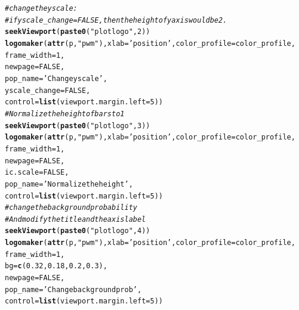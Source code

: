 \documentclass[12pt]{article}\usepackage[]{graphicx}\usepackage[usenames,dvipsnames]{color}
\makeatletter
\newcommand{\hlnum}[1]{\textcolor[rgb]{0.686,0.059,0.569}{#1}}%
\newcommand{\hlstr}[1]{\textcolor[rgb]{0.192,0.494,0.8}{#1}}%
\newcommand{\hlcom}[1]{\textcolor[rgb]{0.678,0.584,0.686}{\textit{#1}}}%
\newcommand{\hlstd}[1]{\textcolor[rgb]{0.345,0.345,0.345}{#1}}%
\newcommand{\hlkwc}[1]{\textcolor[rgb]{0.333,0.667,0.333}{#1}}%
\newcommand{\hlkwd}[1]{\textcolor[rgb]{0.737,0.353,0.396}{\textbf{#1}}}%
\newenvironment{kframe}{%
 \def\at@end@of@kframe{}%
 \ifinner\ifhmode%
  \def\at@end@of@kframe{\end{minipage}}%
  \begin{minipage}{\columnwidth}%
 \fi\fi%
 \def\FrameCommand##1{\hskip\@totalleftmargin \hskip-\fboxsep
 \colorbox{shadecolor}{##1}\hskip-\fboxsep
     \hskip-\linewidth \hskip-\@totalleftmargin \hskip\columnwidth}%
 \MakeFramed {\advance\hsize-\width
   \@totalleftmargin\z@ \linewidth\hsize
   \@setminipage}}%
 {\par\unskip\endMakeFramed%
 \at@end@of@kframe}
\newenvironment{knitrout}{}{} %
\makeatother
\begin{document}
\begin{knitrout}
\begin{kframe}
\begin{alltt}
\hlcom{#change the y scale:}
\hlcom{#if yscale_change = FALSE, then the height of y axis would be 2.}
\hlkwd{seekViewport}\hlstd{(}\hlkwd{paste0}\hlstd{(}\hlstr{"plotlogo"}\hlstd{,} \hlnum{2}\hlstd{))}
\hlkwd{logomaker}\hlstd{(}\hlkwd{attr}\hlstd{(p,} \hlstr{"pwm"}\hlstd{),}\hlkwc{xlab} \hlstd{=} \hlstr{'position'}\hlstd{,}\hlkwc{color_profile} \hlstd{= color_profile,}
          \hlkwc{frame_width} \hlstd{=} \hlnum{1}\hlstd{,}
          \hlkwc{newpage} \hlstd{=} \hlnum{FALSE}\hlstd{,}
          \hlkwc{pop_name} \hlstd{=} \hlstr{'Change y scale'}\hlstd{,}
          \hlkwc{yscale_change} \hlstd{=} \hlnum{FALSE}\hlstd{,}
          \hlkwc{control} \hlstd{=} \hlkwd{list}\hlstd{(}\hlkwc{viewport.margin.left} \hlstd{=} \hlnum{5}\hlstd{))}
\hlcom{#Normalize the height of bars to 1}
\hlkwd{seekViewport}\hlstd{(}\hlkwd{paste0}\hlstd{(}\hlstr{"plotlogo"}\hlstd{,} \hlnum{3}\hlstd{))}
\hlkwd{logomaker}\hlstd{(}\hlkwd{attr}\hlstd{(p,} \hlstr{"pwm"}\hlstd{),}\hlkwc{xlab} \hlstd{=} \hlstr{'position'}\hlstd{,}\hlkwc{color_profile} \hlstd{= color_profile,}
          \hlkwc{frame_width} \hlstd{=} \hlnum{1}\hlstd{,}
          \hlkwc{newpage} \hlstd{=} \hlnum{FALSE}\hlstd{,}
          \hlkwc{ic.scale} \hlstd{=} \hlnum{FALSE}\hlstd{,}
          \hlkwc{pop_name} \hlstd{=} \hlstr{'Normalize the height'}\hlstd{,}
          \hlkwc{control} \hlstd{=} \hlkwd{list}\hlstd{(}\hlkwc{viewport.margin.left} \hlstd{=} \hlnum{5}\hlstd{))}
\hlcom{#change the background probability}
\hlcom{#And modify the title and the axis label}
\hlkwd{seekViewport}\hlstd{(}\hlkwd{paste0}\hlstd{(}\hlstr{"plotlogo"}\hlstd{,} \hlnum{4}\hlstd{))}
\hlkwd{logomaker}\hlstd{(}\hlkwd{attr}\hlstd{(p,} \hlstr{"pwm"}\hlstd{),}\hlkwc{xlab} \hlstd{=} \hlstr{'position'}\hlstd{,}\hlkwc{color_profile} \hlstd{= color_profile,}
          \hlkwc{frame_width} \hlstd{=} \hlnum{1}\hlstd{,}
          \hlkwc{bg}\hlstd{=}\hlkwd{c}\hlstd{(}\hlnum{0.32}\hlstd{,} \hlnum{0.18}\hlstd{,} \hlnum{0.2}\hlstd{,} \hlnum{0.3}\hlstd{),}
          \hlkwc{newpage} \hlstd{=} \hlnum{FALSE}\hlstd{,}
          \hlkwc{pop_name} \hlstd{=} \hlstr{'Change background prob'}\hlstd{,}
          \hlkwc{control} \hlstd{=} \hlkwd{list}\hlstd{(}\hlkwc{viewport.margin.left} \hlstd{=} \hlnum{5}\hlstd{))}
\end{alltt}
\end{kframe}

\end{knitrout}
\end{document}
